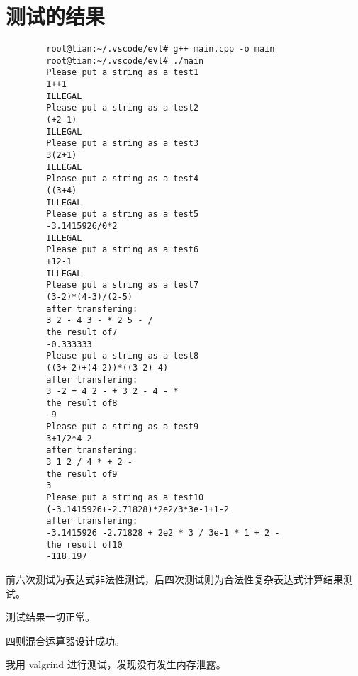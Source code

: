 \documentclass[UTF8]{ctexart}
\begin{document}
	\section{测试的结果}
	
	\begin{lstlisting}
		root@tian:~/.vscode/evl# g++ main.cpp -o main
		root@tian:~/.vscode/evl# ./main
		Please put a string as a test1
		1++1
		ILLEGAL
		Please put a string as a test2
		(+2-1)  
		ILLEGAL
		Please put a string as a test3
		3(2+1)
		ILLEGAL
		Please put a string as a test4
		((3+4)
		ILLEGAL
		Please put a string as a test5
		-3.1415926/0*2
		ILLEGAL
		Please put a string as a test6
		+12-1
		ILLEGAL
		Please put a string as a test7
		(3-2)*(4-3)/(2-5)
		after transfering:
		3 2 - 4 3 - * 2 5 - / 
		the result of7
		-0.333333
		Please put a string as a test8
		((3+-2)+(4-2))*((3-2)-4)       
		after transfering:
		3 -2 + 4 2 - + 3 2 - 4 - * 
		the result of8
		-9
		Please put a string as a test9
		3+1/2*4-2                           
		after transfering:
		3 1 2 / 4 * + 2 - 
		the result of9
		3
		Please put a string as a test10
		(-3.1415926+-2.71828)*2e2/3*3e-1+1-2
		after transfering:
		-3.1415926 -2.71828 + 2e2 * 3 / 3e-1 * 1 + 2 - 
		the result of10
		-118.197
	\end{lstlisting}
	
	前六次测试为表达式非法性测试，后四次测试则为合法性复杂表达式计算结果测试。
	
	测试结果一切正常。
	
	四则混合运算器设计成功。
	
	我用 valgrind 进行测试，发现没有发生内存泄露。
	
\end{document}
